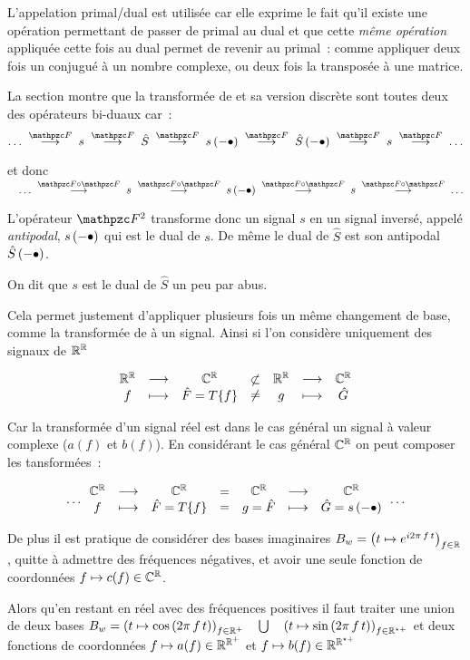 L'appelation primal/dual est utilisée car elle exprime le fait qu'il
existe une opération permettant de passer de primal au dual et que
cette \emph{même opération} appliquée cette fois au dual permet de
revenir au primal~: comme appliquer deux fois un conjugué à un nombre
complexe, ou deux fois la transposée à une matrice.

La section  montre que la transformée de \Fourier{} et sa
version discrète sont toutes deux des opérateurs bi-duaux car~:
$$\ldots \;\toOp{\F}\; s \;\toOp{\F}\; \hat{S} \;\toOp{\F}\; s\p{-\bullet} \;\toOp{\F}\; \hat{S}\p{-\bullet} \;\toOp{\F}\; s \;\toOp{\F}\; \ldots $$

et donc $\quad\ldots \;\toOp{\F\circ\F}\; s \;\toOp{\F\circ\F}\; s\p{-\bullet} \;\toOp{\F\circ\F}\; s \;\toOp{\F\circ\F}\; \ldots$

L'opérateur $\F^2$ transforme donc un signal $s$ en un signal inversé,
appelé \emph{antipodal}, $s\left(-\bullet\right)$ qui est le dual de $s$. De
même le dual de $\hat{S}$ est son antipodal $\hat{S}\left(-\bullet\right)$.

On dit que $s$ est le dual de $\hat{S}$ un peu par abus.

\begin{remarque}
  Cela permet justement d'appliquer plusieurs fois un même changement
  de base, comme la transformée de \Fourier{} à un signal. Ainsi si
  l'on considère uniquement des signaux de $\mathbb{R}^{\mathbb{R}}$

  $$ \begin{array}{ccc} \mathbb{R}^{\mathbb{R}} & \longrightarrow & \mathbb{C}^{\mathbb{R}} \\ f & \longmapsto & \hat{F}=T\{f\} \\ \end{array} \begin{array}{c} {\not\subset} \\ {\neq} \end{array} \begin{array}{ccc} \mathbb{R}^{\mathbb{R}} & \longrightarrow & \mathbb{C}^{\mathbb{R}} \\ g & \longmapsto & \hat{G} \\ \end{array}$$

  Car la transformée d'un signal réel est dans le cas général un signal à valeur complexe ($a(f)$ et $b(f)$). En considérant le cas général $\mathbb{C}^{\mathbb{R}}$ on peut composer les tansformées~:

  $$ \ldots\begin{array}{ccc} \mathbb{C}^{\mathbb{R}} & \longrightarrow & \mathbb{C}^{\mathbb{R}} \\ f & \longmapsto & \hat{F}=T\{f\} \\ \end{array} \begin{array}{c} {=} \\ {=} \end{array} \begin{array}{ccc} \mathbb{C}^{\mathbb{R}} & \longrightarrow & \mathbb{C}^{\mathbb{R}} \\ g=\hat{F} & \longmapsto & \hat{G}=s\left(-\bullet\right) \\ \end{array} \ldots$$

  De plus il est pratique de considérer des bases imaginaires $B_w=\left(t\mapsto e^{i2\pi\,f\,t}\right)_{f\in\mathbb{R}}$, quitte à admettre des fréquences négatives, et avoir une seule fonction de coordonnées $f\mapsto c(f)\in\mathbb{C}^{\mathbb{R}}$.

  Alors qu'en restant en réel avec des fréquences positives il faut traiter une union de deux bases $B_w = \left(t\mapsto \cos\left(2\pi\,f\,t\right)\right)_{f\in\mathbb{R}^+} \quad \bigcup \quad \left(t\mapsto \sin\left(2\pi\,f\,t\right)\right)_{f\in\mathbb{R}^{\star +}}$ et deux fonctions de coordonnées $f\mapsto a(f)\in\mathbb{R}^{\mathbb{R}^+}$ et $f\mapsto b(f)\in\mathbb{R}^{\mathbb{R}^{\star +}}$ 

\end{remarque}
  




